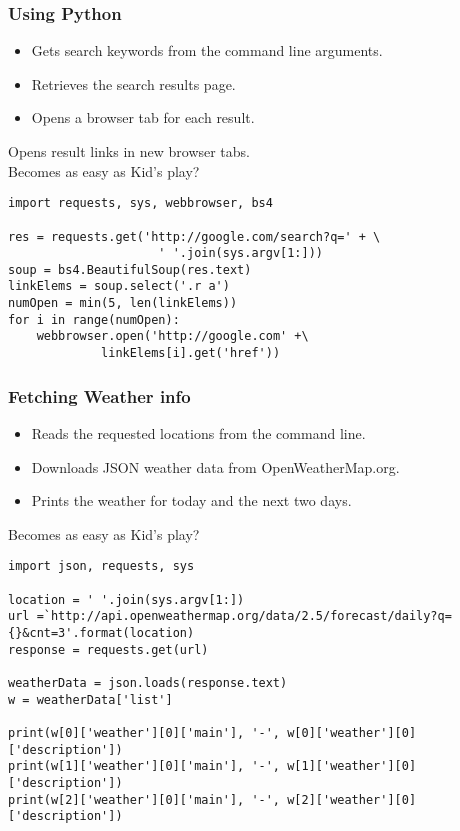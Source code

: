 \begin{frame}[fragile]\frametitle{Using Python}
\begin{itemize}
\item Gets search keywords from the command line arguments.
\item Retrieves the search results page.
\item Opens a browser tab for each result.
\end{itemize}

Opens result links in new browser tabs. \\
Becomes as easy as Kid's play?

\begin{lstlisting}
import requests, sys, webbrowser, bs4

res = requests.get('http://google.com/search?q=' + \
					 ' '.join(sys.argv[1:]))
soup = bs4.BeautifulSoup(res.text)
linkElems = soup.select('.r a')
numOpen = min(5, len(linkElems))
for i in range(numOpen):
    webbrowser.open('http://google.com' +\
    		 linkElems[i].get('href'))
\end{lstlisting}

\end{frame}

\begin{frame}[fragile]\frametitle{Fetching Weather info}
\begin{itemize}
\item Reads the requested locations from the command line.
\item Downloads JSON weather data from OpenWeatherMap.org.
\item Prints the weather for today and the next two days.
\end{itemize}

Becomes as easy as Kid's play?


\begin{lstlisting}
import json, requests, sys

location = ' '.join(sys.argv[1:])
url =`http://api.openweathermap.org/data/2.5/forecast/daily?q={}&cnt=3'.format(location)
response = requests.get(url)

weatherData = json.loads(response.text)
w = weatherData['list']

print(w[0]['weather'][0]['main'], '-', w[0]['weather'][0]['description'])
print(w[1]['weather'][0]['main'], '-', w[1]['weather'][0]['description'])
print(w[2]['weather'][0]['main'], '-', w[2]['weather'][0]['description'])
\end{lstlisting}
\end{frame}
